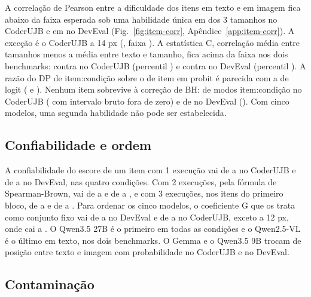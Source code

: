 A correlação de Pearson entre a dificuldade dos itens em texto e em imagem fica abaixo da faixa esperada sob uma habilidade única em \corrBelowRefUjb{} dos 3 tamanhos no CoderUJB e em \corrBelowRefDev{} no DevEval (Fig.~\ref{fig:item-corr}, Apêndice~\ref{app:item-corr}). A exceção é o CoderUJB a 14 px (\corrFourteenUjb, faixa \ci{\corrFourteenUjbRefLo}{\corrFourteenUjbRefHi}). A estatística C, correlação média entre tamanhos menos a média entre texto e tamanho, fica acima da faixa nos dois benchmarks: \cPearsonUjb{} contra \ci{\cPearsonRefLoUjb}{\cPearsonRefHiUjb} no CoderUJB (percentil \cPearsonPercentileUjb) e \cPearsonDev{} contra \ci{\cPearsonRefLoDev}{\cPearsonRefHiDev} no DevEval (percentil \cPearsonPercentileDev). A razão do DP de item:condição sobre o de item em probit é parecida com a de logit (\sdRatioProbitUjb{} e \sdRatioProbitDev). Nenhum item sobrevive à correção de BH: \bhFlaggedUjb{} de \nItemFlagsUjb{} modos item:condição no CoderUJB (\rawFlaggedUjb{} com intervalo bruto fora de zero) e \bhFlaggedDev{} de \nItemFlagsDev{} no DevEval (\rawFlaggedDev). Com cinco modelos, uma segunda habilidade não pode ser estabelecida.


\subsection{Confiabilidade e ordem}
\label{sec:conf}

A confiabilidade do escore de um item com 1 execução vai de \relOneMinUjb{} a \relOneMaxUjb{} no CoderUJB e de \relOneMinDev{} a \relOneMaxDev{} no DevEval, nas quatro condições. Com 2 execuções, pela fórmula de Spearman-Brown, vai de \relTwoMinUjb{} a \relTwoMaxUjb{} e de \relTwoMinDev{} a \relTwoMaxDev, e com 3 execuções, nos itens do primeiro bloco, de \relThreeMinUjb{} a \relThreeMaxUjb{} e de \relThreeMinDev{} a \relThreeMaxDev. Para ordenar os cinco modelos, o coeficiente G que os trata como conjunto fixo vai de \gFiniteMinDev{} a \gFiniteMaxDev{} no DevEval e de \gFiniteMinUjb{} a \gFiniteMaxUjb{} no CoderUJB, exceto a 12 px, onde cai a \gFiniteTwelveUjb{} \ci{\gFiniteTwelveUjbLo}{\gFiniteTwelveUjbHi}. O Qwen3.5 27B é o primeiro em todas as condições e o Qwen2.5-VL é o último em texto, nos dois benchmarks. O Gemma e o Qwen3.5 9B trocam de posição entre texto e imagem com probabilidade \swapGemmaQwenNineUjb{} no CoderUJB e \swapGemmaQwenNineDev{} no DevEval.

\subsection{Contaminação}
\label{sec:contam}

